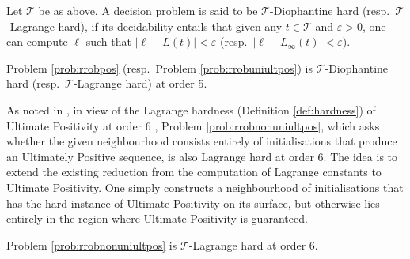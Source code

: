\begin{definition}
\label{def:hardness}
Let $\mathcal{T}$ be as above. A decision problem is said to be $\mathcal{T}$-Diophantine hard (resp.\ $\mathcal{T}$-Lagrange hard), if its decidability entails that given any $t \in \mathcal{T}$ and $\varepsilon > 0$, one can compute $\ell$ such that $|\ell - L(t)| < \varepsilon$ (resp.\  $|\ell - L_\infty(t)| < \varepsilon$).
\end{definition}

\begin{theorem}
\label{thm:hardness}
Problem \ref{prob:rrobpos} (resp.\ Problem \ref{prob:rrobuniultpos}) is $\mathcal{T}$-Diophantine hard (resp.\ $\mathcal{T}$-Lagrange hard) at order 5. 
\end{theorem}

As noted in \cite{originalarxiv}, in view of the Lagrange hardness (Definition \ref{def:hardness}) of Ultimate Positivity at order 6 \cite{joeljames3}, Problem \ref{prob:rrobnonuniultpos}, which asks whether the given neighbourhood consists entirely of initialisations that produce an Ultimately Positive sequence, is also Lagrange hard at order 6. The idea is to extend the existing reduction from the computation of Lagrange constants to Ultimate Positivity. One simply constructs a neighbourhood of initialisations that has the hard instance of Ultimate Positivity on its surface, but otherwise lies entirely in the region where Ultimate Positivity is guaranteed.

\begin{theorem}
\label{thm:hardness2}
Problem \ref{prob:rrobnonuniultpos} is $\mathcal{T}$-Lagrange hard at order 6. 
\end{theorem}